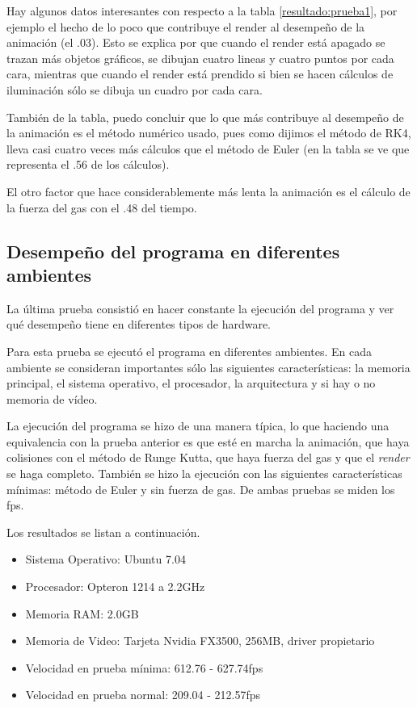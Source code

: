 Hay algunos datos interesantes con respecto a la tabla \ref{resultado:prueba1}, por ejemplo el hecho de lo poco que contribuye el render al desempeño de la animación (el .03). Esto se explica por que cuando el render está apagado se trazan más objetos gráficos, se dibujan cuatro lineas y cuatro puntos por cada cara, mientras que cuando el render está prendido si bien se hacen cálculos de iluminación sólo se dibuja un cuadro por cada cara.

También de la tabla, puedo concluir  que lo que más contribuye al desempeño de la animación es el método numérico usado, pues como dijimos el
método de RK4, lleva casi cuatro veces más cálculos que el método de Euler (en la tabla se ve que representa el .56 de los cálculos).

El otro factor que hace considerablemente más lenta la animación es el cálculo de la fuerza del gas con el .48 del tiempo.

\subsection{Desempeño del programa en diferentes ambientes}

La última prueba consistió en hacer constante la ejecución del programa y ver qué desempeño tiene en diferentes tipos de hardware.

Para esta  prueba se ejecutó el programa en diferentes ambientes. En cada ambiente se consideran importantes sólo las siguientes características: la memoria principal, el sistema operativo, el procesador, la arquitectura y si hay o no memoria de vídeo.

La ejecución del programa se hizo de una manera típica, lo que haciendo una equivalencia con la prueba anterior es que esté en marcha la animación, que haya colisiones con el método de Runge Kutta, que haya fuerza del gas y que el \emph{\foreignlanguage{english}{render}} se haga completo. También se hizo la ejecución con las siguientes características mínimas: método de Euler y sin fuerza de gas. De ambas pruebas se miden los fps.

Los resultados se listan a continuación.
\begin{itemize}
 \item Sistema Operativo: Ubuntu 7.04
 \item Procesador: Opteron 1214 a 2.2GHz
 \item Memoria RAM: 2.0GB
 \item Memoria de Video: Tarjeta Nvidia FX3500, 256MB, driver propietario
 \item Velocidad en prueba mínima: 612.76 - 627.74fps
 \item Velocidad en prueba normal: 209.04 - 212.57fps
\end{itemize}

